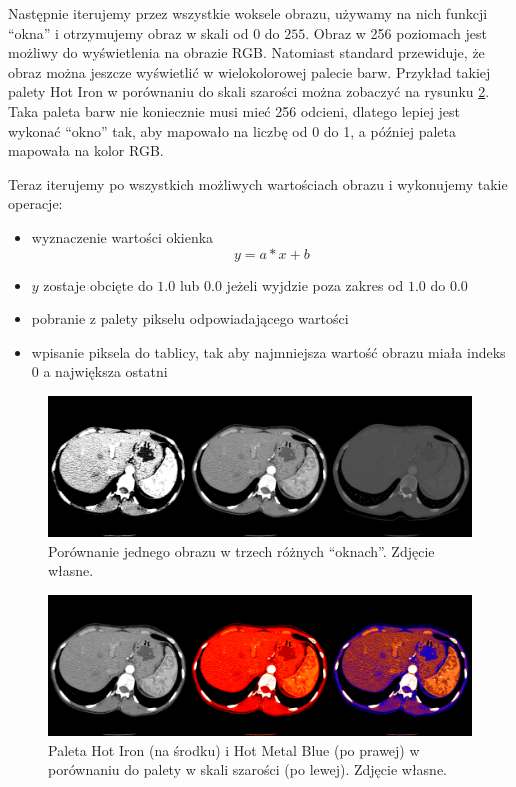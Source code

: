 Następnie iterujemy przez wszystkie woksele obrazu, używamy na nich funkcji \enquote{okna} i otrzymujemy obraz w skali od $0$ do $255$.
Obraz w 256 poziomach jest możliwy do wyświetlenia na obrazie RGB.
Natomiast standard \DICOM przewiduje, że obraz można jeszcze wyświetlić w wielokolorowej palecie barw.
Przykład takiej palety Hot Iron w porównaniu do skali szarości można zobaczyć na rysunku \ref{fig:algorithm-pixmap-monochrome-palette}.
Taka paleta barw nie koniecznie musi mieć 256 odcieni, dlatego lepiej jest wykonać \enquote{okno} tak, aby mapowało na liczbę od 0 do 1, a później paleta mapowała na kolor RGB.
\par
Teraz iterujemy po wszystkich możliwych wartościach obrazu i wykonujemy takie operacje:
\begin{itemize}
    \item wyznaczenie wartości okienka
          \[y = a * x + b\]
    \item $y$ zostaje obcięte do $1.0$ lub $0.0$ jeżeli wyjdzie poza zakres od $1.0$ do $0.0$
    \item pobranie z palety pikselu odpowiadającego wartości
    \item wpisanie piksela do tablicy, tak aby najmniejsza wartość obrazu miała indeks $0$ a największa ostatni
\end{itemize}


\begin{figure}[!htbp]
    \centering
    \includegraphics[width=\textwidth]{img/monochrome-002.png}
    \caption{Porównanie jednego obrazu w trzech różnych \enquote{oknach}.  Zdjęcie własne.}
    \label{fig:algorithm-pixmap-monochrome-multiwindow}
\end{figure}

\begin{figure}[!htbp]
    \centering
    \includegraphics[width=\textwidth]{img/monochrome-003.png}
    \caption{Paleta Hot Iron (na środku) i Hot Metal Blue (po prawej) w porównaniu do palety w skali szarości (po lewej). Zdjęcie własne.}
    \label{fig:algorithm-pixmap-monochrome-palette}
\end{figure}



